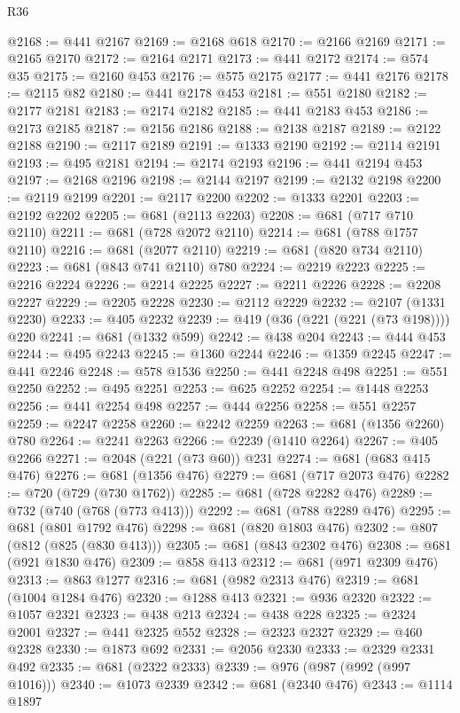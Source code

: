 \begin{lexlean}{R36}
\begin{coremodule}
@2168 := @441 @2167
@2169 := @2168 @618
@2170 := @2166 @2169
@2171 := @2165 @2170
@2172 := @2164 @2171
@2173 := @441 @2172
@2174 := @574 @35
@2175 := @2160 @453
@2176 := @575 @2175
@2177 := @441 @2176
@2178 := @2115 @82
@2180 := @441 @2178 @453
@2181 := @551 @2180
@2182 := @2177 @2181
@2183 := @2174 @2182
@2185 := @441 @2183 @453
@2186 := @2173 @2185
@2187 := @2156 @2186
@2188 := @2138 @2187
@2189 := @2122 @2188
@2190 := @2117 @2189
@2191 := @1333 @2190
@2192 := @2114 @2191
@2193 := @495 @2181
@2194 := @2174 @2193
@2196 := @441 @2194 @453
@2197 := @2168 @2196
@2198 := @2144 @2197
@2199 := @2132 @2198
@2200 := @2119 @2199
@2201 := @2117 @2200
@2202 := @1333 @2201
@2203 := @2192 @2202
@2205 := @681 (@2113 @2203)
@2208 := @681 (@717 @710 @2110)
@2211 := @681 (@728 @2072 @2110)
@2214 := @681 (@788 @1757 @2110)
@2216 := @681 (@2077 @2110)
@2219 := @681 (@820 @734 @2110)
@2223 := @681 (@843 @741 @2110) @780
@2224 := @2219 @2223
@2225 := @2216 @2224
@2226 := @2214 @2225
@2227 := @2211 @2226
@2228 := @2208 @2227
@2229 := @2205 @2228
@2230 := @2112 @2229
@2232 := @2107 (@1331 @2230)
@2233 := @405 @2232
@2239 := @419 (@36 (@221 (@221 (@73 @198)))) @220
@2241 := @681 (@1332 @599)
@2242 := @438 @204
@2243 := @444 @453
@2244 := @495 @2243
@2245 := @1360 @2244
@2246 := @1359 @2245
@2247 := @441 @2246
@2248 := @578 @1536
@2250 := @441 @2248 @498
@2251 := @551 @2250
@2252 := @495 @2251
@2253 := @625 @2252
@2254 := @1448 @2253
@2256 := @441 @2254 @498
@2257 := @444 @2256
@2258 := @551 @2257
@2259 := @2247 @2258
@2260 := @2242 @2259
@2263 := @681 (@1356 @2260) @780
@2264 := @2241 @2263
@2266 := @2239 (@1410 @2264)
@2267 := @405 @2266
@2271 := @2048 (@221 (@73 @60)) @231
@2274 := @681 (@683 @415 @476)
@2276 := @681 (@1356 @476)
@2279 := @681 (@717 @2073 @476)
@2282 := @720 (@729 (@730 @1762))
@2285 := @681 (@728 @2282 @476)
@2289 := @732 (@740 (@768 (@773 @413)))
@2292 := @681 (@788 @2289 @476)
@2295 := @681 (@801 @1792 @476)
@2298 := @681 (@820 @1803 @476)
@2302 := @807 (@812 (@825 (@830 @413)))
@2305 := @681 (@843 @2302 @476)
@2308 := @681 (@921 @1830 @476)
@2309 := @858 @413
@2312 := @681 (@971 @2309 @476)
@2313 := @863 @1277
@2316 := @681 (@982 @2313 @476)
@2319 := @681 (@1004 @1284 @476)
@2320 := @1288 @413
@2321 := @936 @2320
@2322 := @1057 @2321
@2323 := @438 @213
@2324 := @438 @228
@2325 := @2324 @2001
@2327 := @441 @2325 @552
@2328 := @2323 @2327
@2329 := @460 @2328
@2330 := @1873 @692
@2331 := @2056 @2330
@2333 := @2329 @2331 @492
@2335 := @681 (@2322 @2333)
@2339 := @976 (@987 (@992 (@997 @1016)))
@2340 := @1073 @2339
@2342 := @681 (@2340 @476)
@2343 := @1114 @1897

\end{coremodule}
\end{lexlean}
